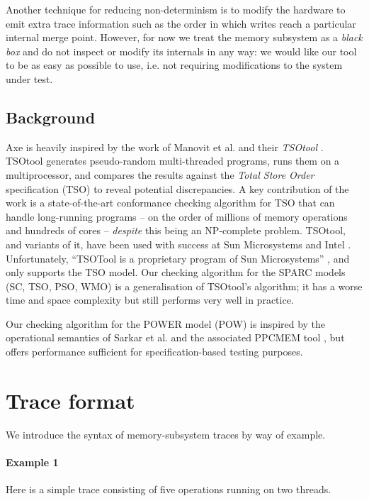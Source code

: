 \documentclass[11pt]{article}
\begin{document}
Another technique for reducing non-determinism is to modify the
hardware to emit extra trace information such as the order in which
writes reach a particular internal merge point.  However, for now we
treat the memory subsystem as a \emph{black box} and do not inspect or
modify its internals in any way: we would
like our tool to be as easy as possible to use, i.e. not requiring
modifications to the system under test.

\subsection{Background}

Axe is heavily inspired by the work of Manovit et al.
\cite{Manovit,TSOToolISCA,TSOToolSPAA,TSOToolHPCA} and their
\emph{TSOtool} \cite{TSOTool}.  TSOtool generates pseudo-random
multi-threaded programs, runs them on a multiprocessor, and compares
the results against the \emph{Total Store Order} specification (TSO)
to reveal potential discrepancies.  A key contribution of the work is
a state-of-the-art conformance checking algorithm for TSO that can
handle long-running programs -- on the order of millions of memory
operations and hundreds of cores -- \emph{despite} this being an NP-complete
problem.  TSOtool, and variants of it, have been used with success at
Sun Microsystems \cite{Manovit} and Intel \cite{IntelChecker}.
Unfortunately, ``TSOTool is a proprietary program of Sun
Microsystems'' \cite{TSOTool}, and only supports the TSO model.  Our
checking algorithm for the SPARC models (SC, TSO, PSO, WMO) is a
generalisation of TSOtool's algorithm; it has a worse time and space
complexity but still performs very well in practice.

Our checking algorithm for the POWER model (POW) is inspired by the
operational semantics of Sarkar et al. \cite{POWER} and the
associated PPCMEM tool \cite{PPCMEM}, but offers performance
sufficient for specification-based testing purposes.

\section{Trace format}
\label{Section:TraceFormat}

We introduce the syntax of memory-subsystem traces by way of example.

\paragraph{Example 1} Here is a simple trace consisting of five
operations running on two threads.  
\end{document}
